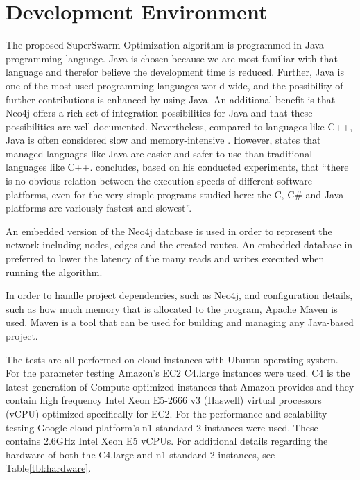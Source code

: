 \section{Development Environment}

The proposed SuperSwarm Optimization algorithm is programmed in Java programming language. Java is chosen because we are most familiar with that language and therefor believe the development time is reduced. Further, Java is one of the most used programming languages world wide, and the possibility of further contributions is enhanced by using Java. An additional benefit is that Neo4j offers a rich set of integration possibilities for Java and that these possibilities are well documented. Nevertheless, compared to languages like C++, Java is often considered slow and memory-intensive \citep{alnaser12}. However, \citet{sestoft10} states that managed languages like Java are easier and safer to use than traditional languages like C++. \citet{sestoft10} concludes, based on his conducted experiments, that ``there is no obvious relation between the execution speeds of different software platforms, even for the very simple programs studied here: the C, C\# and Java platforms are variously fastest and slowest''.

An embedded version of the Neo4j database is used in order to represent the network including nodes, edges and the created routes. An embedded database in preferred to lower the latency of the many reads and writes executed when running the algorithm.

In order to handle project dependencies, such as Neo4j, and configuration details, such as how much memory that is allocated to the program, Apache Maven\citep{website:maven} is used. Maven is a tool that can be used for building and managing any Java-based project. 

The tests are all performed on cloud instances with Ubuntu operating system. For the parameter testing Amazon's EC2 C4.large instances were used. C4 is the latest generation of Compute-optimized instances that Amazon provides and they contain high frequency Intel Xeon E5-2666 v3 (Haswell) virtual processors (vCPU) optimized specifically for EC2\citep{website:amazon}. For the performance and scalability testing Google cloud platform's n1-standard-2 instances were used. These contains 2.6GHz Intel Xeon E5 vCPUs\citep{website:google}. For additional details regarding the hardware of both the C4.large and n1-standard-2 instances, see Table\vref{tbl:hardware}. 


